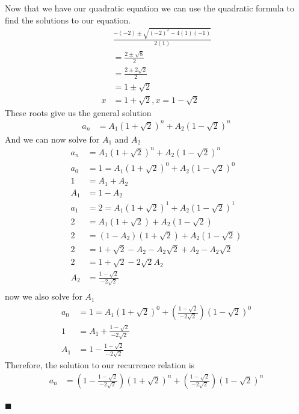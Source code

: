 \documentclass[12pt]{article}
\renewcommand{\qed}{\hfill$\blacksquare$}
\begin{document}
\begin{addmargin}[1em]{1em}
    Now that we have our quadratic equation we can use the quadratic formula to find the solutions to our equation.
    \begin{align*}
        &\frac{-(-2)\pm \sqrt{(-2)^2-4(1)(-1)}}{2(1)}\\
        &= \frac{2 \pm \sqrt{8}}{2}\\
        &= \frac{2 \pm 2\sqrt{2}}{2}\\
        &= 1 \pm \sqrt{2}\\
        x &= 1 + \sqrt{2}, x = 1 - \sqrt{2}
    \end{align*}
    These roots give us the general solution
    \begin{align*}
        a_n &= A_1(1 + \sqrt{2})^n + A_2(1 - \sqrt{2})^n
    \end{align*}
    And we can now solve for $A_1$ and $A_2$
    \begin{align*}
        a_n &= A_1(1 + \sqrt{2})^n + A_2(1 - \sqrt{2})^n\\
        a_0 &= 1 = A_1(1 + \sqrt{2})^0 + A_2(1 - \sqrt{2})^0\\
        1 &= A_1 + A_2\\
        A_1 &= 1 - A_2 \\
        a_1 &= 2 = A_1(1 + \sqrt{2})^1 + A_2(1 - \sqrt{2})^1\\
        2 &= A_1(1 + \sqrt{2}) + A_2(1 - \sqrt{2})\\
        2 &= (1 - A_2)(1 + \sqrt{2}) + A_2(1 - \sqrt{2})\\
        2 &= 1 + \sqrt{2} - A_2 - A_2\sqrt{2} + A_2 - A_2\sqrt{2}\\
        2 &= 1 + \sqrt{2} - 2\sqrt{2}A_2\\
        A_2 &= \frac{1-\sqrt{2}}{-2\sqrt{2}}\\
    \end{align*}
    now we also solve for $A_1$
    \begin{align*}
        a_0 &= 1 = A_1(1 + \sqrt{2})^0 + (\frac{1-\sqrt{2}}{-2\sqrt{2}})(1-\sqrt{2})^0\\
        1 &= A_1 + \frac{1-\sqrt{2}}{-2\sqrt{2}}\\
        A_1 &= 1 - \frac{1-\sqrt{2}}{-2\sqrt{2}}
    \end{align*}
    Therefore, the solution to our recurrence relation is 
    \begin{align*}
        a_n &= (1 - \frac{1-\sqrt{2}}{-2\sqrt{2}})(1 + \sqrt{2})^n + (\frac{1-\sqrt{2}}{-2\sqrt{2}})(1-\sqrt{2})^n\\
    \end{align*}
    \begin{flushright}
    \qed
    \end{flushright}
\end{addmargin}
\end{document}
